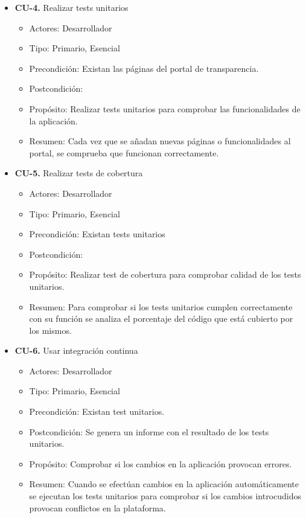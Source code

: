 \begin{itemize}
  \item \textbf{CU-4.} Realizar tests unitarios
  \begin{itemize}
    \item Actores: Desarrollador
    \item Tipo: Primario, Esencial
    \item Precondición: Existan las páginas del portal de transparencia.
    \item Postcondición: 
    \item Propósito: Realizar tests unitarios para comprobar las funcionalidades de la aplicación.
    \item Resumen: Cada vez que se añadan nuevas páginas o funcionalidades al portal, se comprueba que funcionan correctamente.
  \end{itemize}
 
  \item \textbf{CU-5.} Realizar tests de cobertura
  \begin{itemize}
    \item Actores: Desarrollador
    \item Tipo: Primario, Esencial
    \item Precondición: Existan tests unitarios
    \item Postcondición: 
    \item Propósito: Realizar test de cobertura para comprobar calidad de los tests unitarios.
    \item Resumen: Para comprobar si los tests unitarios cumplen correctamente con su función se analiza el porcentaje del
    código que está cubierto por los mismos.
  \end{itemize}
 
  \newpage
  \item \textbf{CU-6.} Usar integración continua
  \begin{itemize}
    \item Actores: Desarrollador
    \item Tipo: Primario, Esencial
    \item Precondición: Existan test unitarios.
    \item Postcondición: Se genera un informe con el resultado de los tests unitarios.
    \item Propósito: Comprobar si los cambios en la aplicación provocan errores.
    \item Resumen: Cuando se efectúan cambios en la aplicación automáticamente se ejecutan los tests unitarios para comprobar si
    los cambios introcudidos provocan conflictos en la plataforma.
  \end{itemize}
 

\end{itemize}
